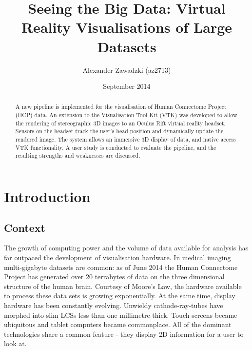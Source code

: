 \documentclass[MSc,paper=a4,pagesize=auto, doublespacing]{icldt}
\title{Seeing the Big Data: Virtual Reality Visualisations of Large Datasets}
\author{Alexander Zawadzki (az2713)}
\date{September 2014}
\begin{document}
\maketitle

\begin{abstract}
A new pipeline is implemented for the visualisation of Human Connectome Project (HCP) data. An extension to the Visualisation Tool Kit (VTK) was developed to allow the rendering of stereographic 3D images to an Oculus Rift virtual reality headset. Sensors on the headset track the user's head position and dynamically update the rendered image. The system allows an immersive 3D display of data, and native access VTK functionality. A user study is conducted to evaluate the pipeline, and the resulting strengths and weaknesses are discussed.


\end{abstract}

\makededication
\tableofcontents

\listoftables
\listoffigures

\chapter{Introduction}
\section{Context}
The growth of computing power and the volume of data available for analysis has far outpaced the development of visualisation hardware. In medical imaging multi-gigabyte datasets are common: as of June 2014 the Human Connectome Project has generated over 20 terrabytes of data on the three dimensional structure of the human brain. Courtesy of Moore's Law, the hardware available to process these data sets is growing exponentially. At the same time, display hardware has been constantly evolving. Unwieldy cathode-ray-tubes have morphed into slim LCSs less than one millimetre thick. Touch-screens became ubiquitous and tablet computers became commonplace. All of the dominant technologies share a common feature - they display 2D information for a user to look at.
\end{document}
